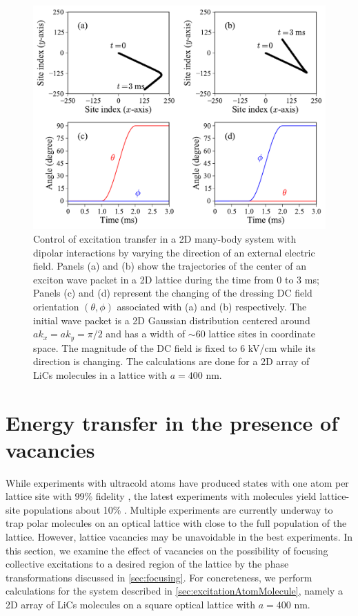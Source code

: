 \begin{figure}[htbp]
\centering
\includegraphics[width=\linewidth]{control-2d-wavepacket.pdf}
\caption{ Control of excitation transfer in a 2D many-body system with dipolar interactions by varying the 
direction of an external electric field.
Panels (a) and (b) show the trajectories of the center of an exciton wave packet in a 2D lattice during
 the time from 0 to 3 ms; Panels (c) and (d) represent the changing of the dressing DC field orientation $(\theta, \phi)$ associated with (a) and
(b) respectively. The initial wave packet is a 2D Gaussian distribution centered around $ak_x=ak_y=\pi/2$ and has a width of $\sim$60 lattice sites in coordinate space. The magnitude of the DC field is fixed to
6 kV/cm while its direction is changing. The calculations are done for a 2D array of  LiCs molecules in a lattice with
$a=400$ nm.
 }
\label{control-2d-wavepacket}
\end{figure}

\section{Energy transfer in the presence of vacancies}
\label{sec:energyTransferVacancy}

While experiments with ultracold atoms have produced states with one atom per lattice site with  99\%  fidelity \cite{atom-mott1, atom-mott2, atom-mott3},
the latest experiments with molecules yield lattice-site populations about  10\% \cite{Ye-arrays-PRL12}.
Multiple experiments are currently underway to  trap polar molecules on an optical lattice with close to the full population of the lattice.
However, lattice vacancies may be unavoidable in the best experiments. In this section, we examine the effect of vacancies on the possibility of focusing collective excitations
to a desired region of the lattice by the phase transformations discussed in \autoref{sec:focusing}. For concreteness, we perform calculations for the system described in \autoref{sec:excitationAtomMolecule},
namely a 2D array of LiCs molecules on a square optical lattice with $a=400$ nm.



